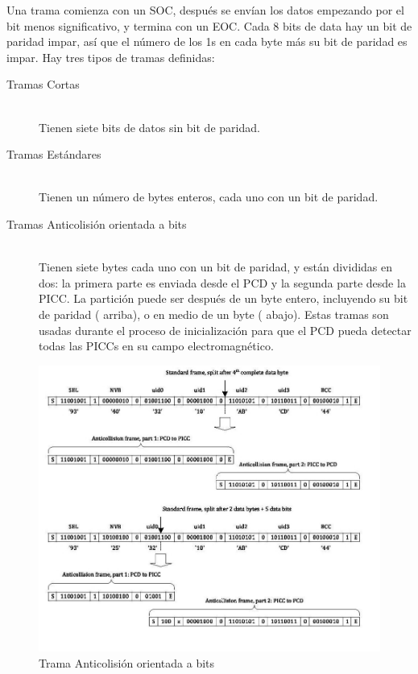 \documentclass[a4paper, twoside, 11pt]{report}
\begin{document}
Una trama comienza con un SOC, después se envían los datos empezando por el bit menos significativo, y termina con un EOC. Cada 8 bits de data hay un bit de paridad impar, así que el número de los 1s en cada byte más su bit de paridad es impar. Hay tres tipos de tramas definidas:

\begin{description}
  \item [Tramas Cortas] \hfill \\ Tienen siete bits de datos sin bit de paridad.
  \item[Tramas Estándares] \hfill \\ Tienen un número de bytes enteros, cada uno con un bit de paridad.
  \item[Tramas Anticolisión orientada a bits] \hfill \\ Tienen siete bytes cada uno con un bit de paridad, y están divididas en dos: la primera parte es enviada desde el PCD y la segunda parte desde la PICC. La partición puede ser después de un byte entero, incluyendo su bit de paridad ( arriba), o en medio de un byte ( abajo). Estas tramas son usadas durante el proceso de inicialización para que el PCD pueda detectar todas las PICCs en su campo electromagnético.
\end{description}

\begin{figure}[htb]
  \centering
  \includegraphics[scale=0.5]{./img/anticollision_frames}
  \caption{Trama Anticolisión orientada a bits~\cite[Modificaciones Mías]{iso14443-3}}
  \label{fig:anticollision}
\end{figure}
\end{document}
